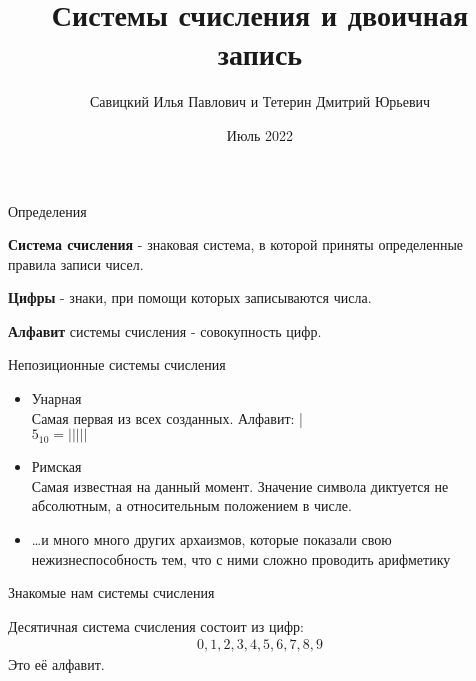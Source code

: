 \documentclass[hyperref=unicode, aspectratio=169]{beamer}
\title{Системы счисления и двоичная запись }
\author[]{Савицкий Илья Павлович и Тетерин Дмитрий Юрьевич}
\date[]{Июль 2022}
\begin{document}
\maketitle

\begin{frame}{Определения}
    \begin{definition}{\textbf{Система счисления}}
        - знаковая система, в которой приняты определенные правила записи чисел.
    \end{definition}
    \begin{definition}{\textbf{Цифры}}
        - знаки, при помощи которых записываются числа.
    \end{definition}
    \begin{definition}{\textbf{Алфавит}}
        системы счисления - совокупность цифр.
    \end{definition}
\end{frame}

\begin{frame}{Непозиционные системы счисления}
    \begin{itemize}
        \item Унарная \\
              Самая первая из всех созданных. Алфавит: | \\
              $5_{10} = |||||$
        \item Римская \\
              Самая известная на данный момент. Значение символа диктуется не абсолютным, а относительным положением в числе.
        \item \ldots и много много других архаизмов, которые показали свою нежизнеспособность тем, что с ними сложно проводить арифметику
    \end{itemize}
\end{frame}

\begin{frame}{Знакомые нам системы счисления}
    \begin{example}
        Десятичная система счисления состоит из цифр:
        \begin{gather*}
            0, 1, 2, 3, 4, 5, 6, 7, 8, 9
        \end{gather*}
        Это её алфавит.
    \end{example}
\end{frame}
\end{document}
